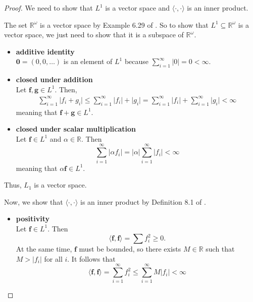 \begin{proof}
    We need to show that $L^1$ is a vector space and $\langle \cdot, \cdot \rangle$ is an inner product.

    The set $\mathbb{R}^{\omega}$ is a vector space by Example 6.29 of \cite{axler2020}.
    So to show that $L^1 \subseteq \mathbb{R}^{\omega}$ is a vector space, we just need to show that it is a subspace of $\mathbb{R}^{\omega}$.
    \begin{itemize}
        \item \textbf{additive identity}\\
            $\mathbf{0} = (0, 0, \dots)$ is an element of $L^1$ because
            $\sum\limits_{i=1}^{\infty} \lvert 0 \rvert = 0 < \infty$.
        \item \textbf{closed under addition} \\
            Let $\mathbf{f}, \mathbf{g} \in L^1$.
            Then,
            \begin{align*}
                \sum\limits_{i=1}^{\infty} \lvert f_i + g_i \rvert
                \leq \sum\limits_{i=1}^{\infty} \lvert f_i \rvert + \lvert g_i \rvert
                = \sum\limits_{i=1}^{\infty} \lvert f_i \rvert + \sum\limits_{i=1}^{\infty} \lvert g_i \rvert
                < \infty
            \end{align*}
            meaning that $\mathbf{f} + \mathbf{g} \in L^1$.
        \item \textbf{closed under scalar multiplication} \\
            Let $\mathbf{f} \in L^1$ and $\alpha \in \mathbb{R}$.
            Then
            \begin{equation*}
                \sum\limits_{i=1}^{\infty} \lvert \alpha f_i \rvert
                = \lvert \alpha \rvert \sum\limits_{i=1}^{\infty} \lvert f_i \rvert
                < \infty
            \end{equation*}
            meaning that $\alpha \mathbf{f} \in L^1$.
    \end{itemize}
    Thus, $L_1$ is a vector space.

    Now, we show that $\langle \cdot , \cdot \rangle$ is an inner product by Definition 8.1 of \cite{axler2020}.
    \begin{itemize}
        \item \textbf{positivity}\\
            Let $\mathbf{f} \in L^1$.
            Then
            \begin{equation*}
                \langle \mathbf{f}, \mathbf{f} \rangle
                = \sum f_i^2
                \geq 0.
            \end{equation*}
            At the same time, $\mathbf{f}$ must be bounded, so there exists $M \in \mathbb{R}$ such that $M > \lvert f_i \rvert$ for all $i$.
            It follows that
            \begin{equation*}
                \langle \mathbf{f}, \mathbf{f} \rangle
                = \sum\limits_{i=1}^{\infty} f_i^2
                \leq \sum\limits_{i=1}^{\infty}
                M \lvert f_i \rvert < \infty
            \end{equation*}


\end{itemize}
\end{proof}
